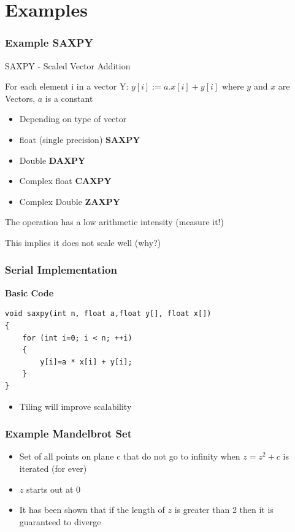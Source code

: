 \documentclass{beamer}
\begin{document}
\section{Examples}
\begin{frame}
	\frametitle{Example SAXPY}
SAXPY - Scaled Vector Addition

For each element i in a vector Y:
$y[i] := a.x[i]+y[i]$
where $y$ and $x$ are Vectors, $a$ is a constant

\begin{itemize}
	\item Depending on type of vector
	\item float (single precision) \textbf{SAXPY}
	\item Double \textbf{DAXPY}
	\item Complex float \textbf{CAXPY}
	\item Complex Double \textbf{ZAXPY}
\end{itemize}

The operation has a low arithmetic intensity (measure it!)

This implies it does not scale well (why?)
\end{frame}

\begin{frame}[fragile=singleslide]
	\frametitle{Serial Implementation}
\textbf{Basic Code}


\begin{lstlisting}
void saxpy(int n, float a,float y[], float x[])
{
	for (int i=0; i < n; ++i)
	{
		y[i]=a * x[i] + y[i];
	}
}
\end{lstlisting}



\begin{itemize}
	\item Tiling will improve scalability
\end{itemize}
\end{frame}

\begin{frame}
	\frametitle{Example Mandelbrot Set}

\begin{itemize}
	\item Set of all points on plane c that do not go to infinity when $z=z^{2}+c$ is iterated (for ever)
	\item $z$ starts out at 0
	\item It has been shown that if the length of $z$ is greater than 2 then it is guaranteed to diverge
\end{itemize}
\end{frame}
\end{document}
